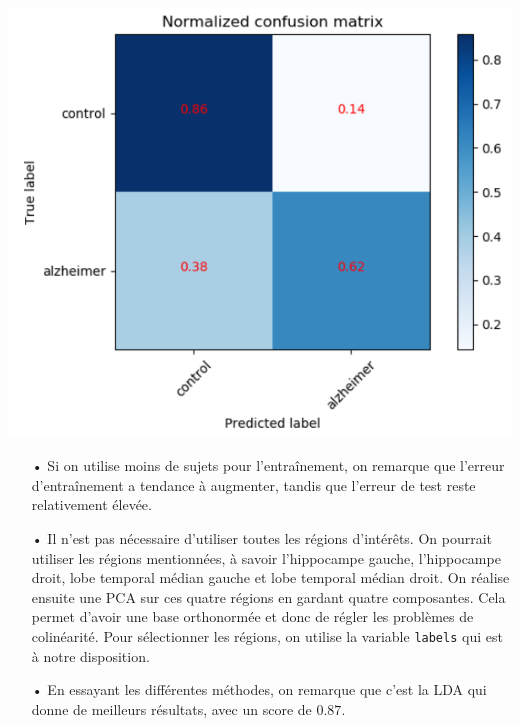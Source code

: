 \documentclass[a4paper, 10pt]{article}
\begin{document}
\begin{center}
	\includegraphics[scale=0.7]{confusion_matrix_alzheimer.PNG}
\end{center}

\hspace*{2mm}

\begin{itemize}

	\item[•] Si on utilise moins de sujets pour l'entraînement, on remarque que l'erreur d'entraînement a tendance à augmenter, tandis que l'erreur de test reste relativement élevée.
	
	\item[•] Il n'est pas nécessaire d'utiliser toutes les régions d'intérêts. On pourrait utiliser les régions mentionnées, à savoir l'hippocampe gauche, l'hippocampe droit, lobe temporal médian gauche et lobe temporal médian droit. On réalise ensuite une PCA sur ces quatre régions en gardant quatre composantes. Cela permet d'avoir une base orthonormée et donc de régler les problèmes de colinéarité. Pour sélectionner les régions, on utilise la variable \texttt{labels} qui est à notre disposition.
	
	\item[•] En essayant les différentes méthodes, on remarque que c'est la LDA qui donne de meilleurs résultats, avec un score de $0.87$.

\end{itemize}
\end{document}
